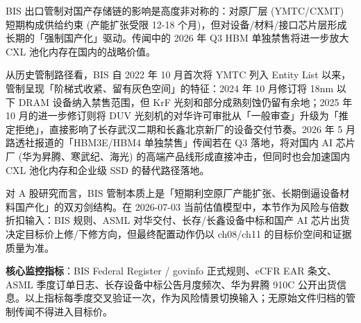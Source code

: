 BIS 出口管制对国产存储链的影响是高度非对称的：对原厂层 (YMTC\slash CXMT) 短期构成供给约束 (产能扩张受限 12-18 个月)，但对设备/材料/接口芯片层形成长期的「强制国产化」驱动。传闻中的 2026 年 Q3 HBM 单独禁售将进一步放大 CXL 池化内存在国内的战略价值。

从历史管制路径看，BIS 自 2022 年 10 月首次将 YMTC 列入 Entity List 以来，管制呈现「阶梯式收紧、留有灰色空间」的特征：2024 年 10 月修订将 18nm 以下 DRAM 设备纳入禁售范围，但 KrF 光刻和部分成熟刻蚀仍留有余地；2025 年 10 月的进一步修订则将 DUV 光刻机的对华许可审批从「一般审查」升级为「推定拒绝」，直接影响了长存武汉二期和长鑫北京新厂的设备交付节奏。2026 年 5 月路透社报道的「HBM3E/HBM4 单独禁售」传闻若在 Q3 落地，将对国内 AI 芯片厂 (华为昇腾、寒武纪、海光) 的高端产品线形成直接冲击，但同时也会加速国内 CXL 池化内存和企业级 SSD 的替代路径落地。

对 A 股研究而言，BIS 管制本质上是「短期利空原厂产能扩张、长期倒逼设备材料国产化」的双刃剑结构。在 2026-07-03 当前估值模型中，本节作为风险与倍数折扣输入：BIS 规则、ASML 对华交付、长存/长鑫设备中标和国产 AI 芯片出货决定目标价上修/下修方向，但最终配置动作仍以 ch08/ch11 的目标价空间和证据质量为准。\par
\textbf{核心监控指标}：BIS Federal Register / govinfo 正式规则、eCFR EAR 条文、ASML 季度订单日志、长存设备中标公告月度频次、华为昇腾 910C 公开出货信息。以上指标每季度交叉验证一次，作为风险情景切换输入；无原始文件归档的管制传闻不得进入目标价。
